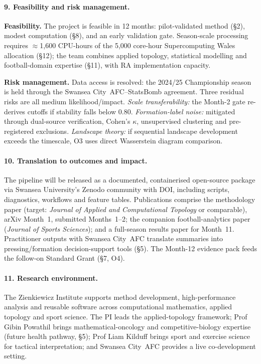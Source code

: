 \paragraph{9. Feasibility and risk management.}
\textbf{Feasibility.} The project is feasible in 12 months: pilot-validated method (\S2), modest computation (\S8), and an early validation gate. Season-scale processing requires $\approx$1{,}600 CPU-hours of the 5{,}000 core-hour Supercomputing Wales allocation (\S12); the team combines applied topology, statistical modelling and football-domain expertise (\S11), with RA implementation capacity.

\textbf{Risk management.} Data access is resolved: the 2024/25 Championship season is held through the Swansea City~AFC--StatsBomb agreement. Three residual risks are all medium likelihood/impact. \emph{Scale transferability:} the Month-2 gate re-derives cutoffs if stability falls below 0.80. \emph{Formation-label noise:} mitigated through dual-source verification, Cohen's $\kappa$, unsupervised clustering and pre-registered exclusions. \emph{Landscape theory:} if sequential landscape development exceeds the timescale, O3 uses direct Wasserstein diagram comparison.

\paragraph{10. Translation to outcomes and impact.}
The pipeline will be released as a documented, containerised open-source package via Swansea University's Zenodo community with DOI, including scripts, diagnostics, workflows and feature tables. Publications comprise the methodology paper \citep{Brown2026} (target: \emph{Journal of Applied and Computational Topology} or comparable), arXiv Month~1, submitted Months~1--2; the companion football-analytics paper \citep{Brown2026b} (\emph{Journal of Sports Sciences}); and a full-season results paper for Month~11. Practitioner outputs with Swansea City~AFC translate summaries into pressing/formation decision-support tools (\S5). The Month-12 evidence pack feeds the follow-on Standard Grant (\S7, O4).

\paragraph{11. Research environment.}
The Zienkiewicz Institute supports method development, high-performance analysis and reusable software across computational mathematics, applied topology and sport science. The PI leads the applied-topology framework; Prof Gibin Powathil brings mathematical-oncology and competitive-biology expertise (future health pathway, \S5); Prof Liam Kilduff brings sport and exercise science for tactical interpretation; and Swansea City~AFC provides a live co-development setting.

